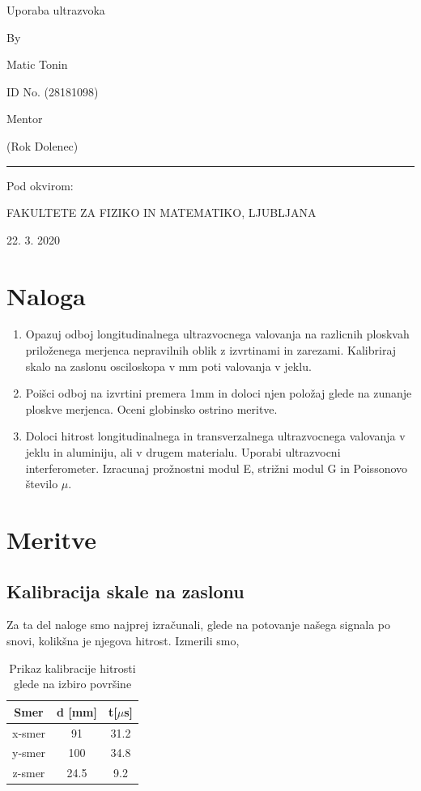 \documentclass[11pt, a4paper]{article}
\theoremstyle{definition}
\theoremstyle{example}
\theoremstyle{izrek}
\begin{document}
\begin{center}
\thispagestyle{empty}
\parskip=14pt%
\vspace*{3\parskip}%
\begin{Huge} Uporaba ultrazvoka \end{Huge}

By

Matic Tonin

ID No. (28181098)

Mentor 

(Rok Dolenec)

\rule{7cm}{0.4pt}

Pod okvirom:

FAKULTETE ZA FIZIKO IN MATEMATIKO, LJUBLJANA

22. 3. 2020

\end{center}
\pagebreak
\section{Naloga}
\begin{enumerate}
\item Opazuj odboj longitudinalnega ultrazvocnega valovanja na razlicnih ploskvah priloženega
merjenca nepravilnih oblik z izvrtinami in zarezami. Kalibriraj skalo na
zaslonu osciloskopa v mm poti valovanja v jeklu.
\item Poišci odboj na izvrtini premera 1mm in doloci njen položaj glede na zunanje
ploskve merjenca. Oceni globinsko ostrino meritve.
\item Doloci hitrost longitudinalnega in transverzalnega ultrazvocnega valovanja v jeklu
in aluminiju, ali v drugem materialu. Uporabi ultrazvocni interferometer. Izracunaj
prožnostni modul E, strižni modul G in Poissonovo število $\mu$.
\end{enumerate}

\section{Meritve}
\subsection{Kalibracija skale na zaslonu}
Za ta del naloge smo najprej izračunali, glede na potovanje našega signala po snovi, kolikšna je njegova hitrost. 
Izmerili smo, 
\begin{table}[ht]
	\centering
	\begin{tabular}{|c|c|c|}
		\hline
		Smer & d [mm] & t[$\mu$s]  \\
		\hline
		\hline
		x-smer& 91 & 31.2\\
		\hline
		y-smer& 100 & 34.8 \\
		\hline
		z-smer& 24.5 & 9.2\\
		\hline
		\end{tabular}
		\caption{Prikaz kalibracije hitrosti glede na izbiro površine}
		\label{tab:FirstTable}
\end{table}
\end{document}
